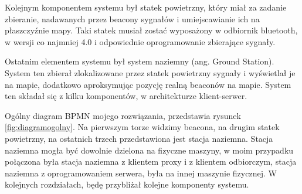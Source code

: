 Kolejnym komponentem systemu był statek powietrzny, który miał za zadanie zbieranie, nadawanych przez beacony sygnałów i umiejscawianie ich na płaszczyźnie mapy. Taki statek musiał zostać wyposażony w odbiornik bluetooth, w wersji co najmniej 4.0 i odpowiednie oprogramowanie zbierające sygnały.

Ostatnim elementem systemu był system naziemny (ang. Ground Station). System ten zbierał zlokalizowane przez statek powietrzny sygnały i wyświetlał je na mapie, dodatkowo aproksymując pozycję realną beaconów na mapie. System ten składał się z kilku komponentów, w architekturze klient-serwer.

Ogólny diagram BPMN mojego rozwiązania, przedstawia rysunek \ref{fig:diagramogolny}. Na pierwszym torze widzimy beacona, na drugim statek powietrzny, na ostatnich trzech przedstawiona jest stacja naziemna. Stacja naziemna mogła być dowolnie dzielona na fizyczne maszyny, w moim przypadku połączona była stacja naziemna z klientem proxy i z klientem odbiorczym, stacja naziemna z oprogramowaniem serwera, była na innej maszynie fizycznej. W kolejnych rozdziałach, będę przybliżał kolejne komponenty systemu.

